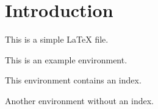 \documentclass{article}
\begin{document}
\section{Introduction}
This is a simple LaTeX file.
\begin{example}
	This is an example environment.
\end{example}
\begin{hProposition}
	This environment contains an index.
\end{hProposition}
\begin{theorem}
	Another environment without an index.
\end{theorem}
\end{document}
